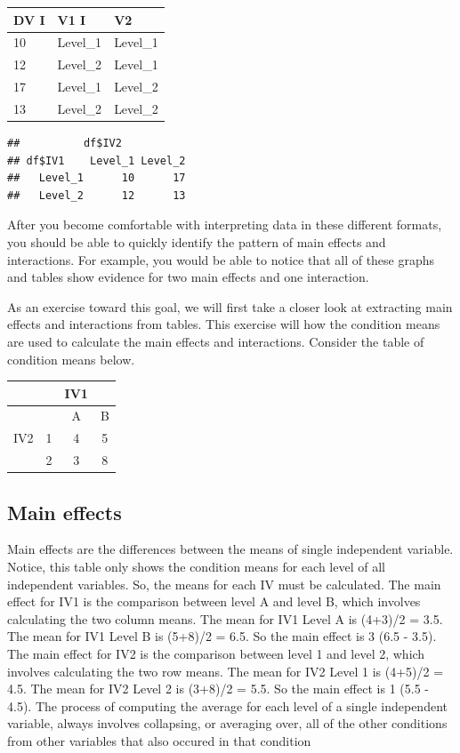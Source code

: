\begin{longtable}[]{@{}lll@{}}
\toprule
DV I & V1 I & V2\tabularnewline
\midrule
\endhead
10 & Level\_1 & Level\_1\tabularnewline
12 & Level\_2 & Level\_1\tabularnewline
17 & Level\_1 & Level\_2\tabularnewline
13 & Level\_2 & Level\_2\tabularnewline
\bottomrule
\end{longtable}

\begin{verbatim}
##          df$IV2
## df$IV1    Level_1 Level_2
##   Level_1      10      17
##   Level_2      12      13
\end{verbatim}

After you become comfortable with interpreting data in these different
formats, you should be able to quickly identify the pattern of main
effects and interactions. For example, you would be able to notice that
all of these graphs and tables show evidence for two main effects and
one interaction.

As an exercise toward this goal, we will first take a closer look at
extracting main effects and interactions from tables. This exercise will
how the condition means are used to calculate the main effects and
interactions. Consider the table of condition means below.

\begin{longtable}[]{@{}cccc@{}}
\toprule
& & IV1 &\tabularnewline
\midrule
\endhead
& & A & B\tabularnewline
IV2 & 1 & 4 & 5\tabularnewline
& 2 & 3 & 8\tabularnewline
\bottomrule
\end{longtable}

\subsection{Main effects}\label{main-effects-1}

Main effects are the differences between the means of single independent
variable. Notice, this table only shows the condition means for each
level of all independent variables. So, the means for each IV must be
calculated. The main effect for IV1 is the comparison between level A
and level B, which involves calculating the two column means. The mean
for IV1 Level A is (4+3)/2 = 3.5. The mean for IV1 Level B is (5+8)/2 =
6.5. So the main effect is 3 (6.5 - 3.5). The main effect for IV2 is the
comparison between level 1 and level 2, which involves calculating the
two row means. The mean for IV2 Level 1 is (4+5)/2 = 4.5. The mean for
IV2 Level 2 is (3+8)/2 = 5.5. So the main effect is 1 (5.5 - 4.5). The
process of computing the average for each level of a single independent
variable, always involves collapsing, or averaging over, all of the
other conditions from other variables that also occured in that
condition

